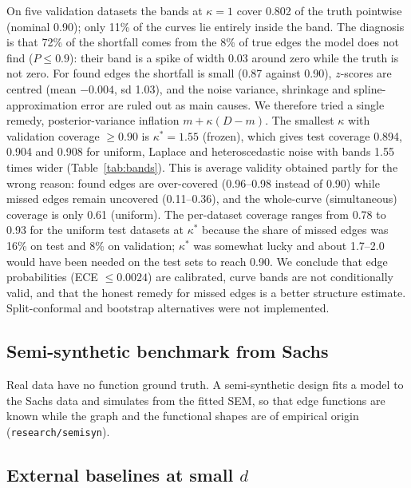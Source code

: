 \documentclass[11pt,a4paper]{article}
\begin{document}
On five validation datasets the bands at $\kappa=1$ cover 0.802 of the truth pointwise (nominal 0.90); only 11\% of the curves lie entirely inside the band. The diagnosis is that 72\% of the shortfall comes from the 8\% of true edges the model does not find ($P\le0.9$): their band is a spike of width 0.03 around zero while the truth is not zero. For found edges the shortfall is small (0.87 against 0.90), $z$-scores are centred (mean $-0.004$, sd 1.03), and the noise variance, shrinkage and spline-approximation error are ruled out as main causes. We therefore tried a single remedy, posterior-variance inflation $m+\kappa(D-m)$. The smallest $\kappa$ with validation coverage $\ge0.90$ is $\kappa^\ast=1.55$ (frozen), which gives test coverage 0.894, 0.904 and 0.908 for uniform, Laplace and heteroscedastic noise with bands 1.55 times wider (Table~\ref{tab:bands}). This is average validity obtained partly for the wrong reason: found edges are over-covered (0.96--0.98 instead of 0.90) while missed edges remain uncovered (0.11--0.36), and the whole-curve (simultaneous) coverage is only 0.61 (uniform). The per-dataset coverage ranges from 0.78 to 0.93 for the uniform test datasets at $\kappa^\ast$ because the share of missed edges was 16\% on test and 8\% on validation; $\kappa^\ast$ was somewhat lucky and about 1.7--2.0 would have been needed on the test sets to reach 0.90. We conclude that edge probabilities (ECE $\le0.0024$) are calibrated, curve bands are not conditionally valid, and that the honest remedy for missed edges is a better structure estimate. Split-conformal and bootstrap alternatives were not implemented.

\subsection{Semi-synthetic benchmark from Sachs}
\label{sec:semisyn}

Real data have no function ground truth. A semi-synthetic design fits a model to the Sachs data and simulates from the fitted SEM, so that edge functions are known while the graph and the functional shapes are of empirical origin (\texttt{research/semisyn}).

\begin{table}[t]
\centering
\caption{Semi-synthetic Sachs benchmark (research/semisyn).}
\label{tab:semisyn}

\end{table}


\subsection{External baselines at small \texorpdfstring{$d$}{d}}
\label{sec:external}
\end{document}
